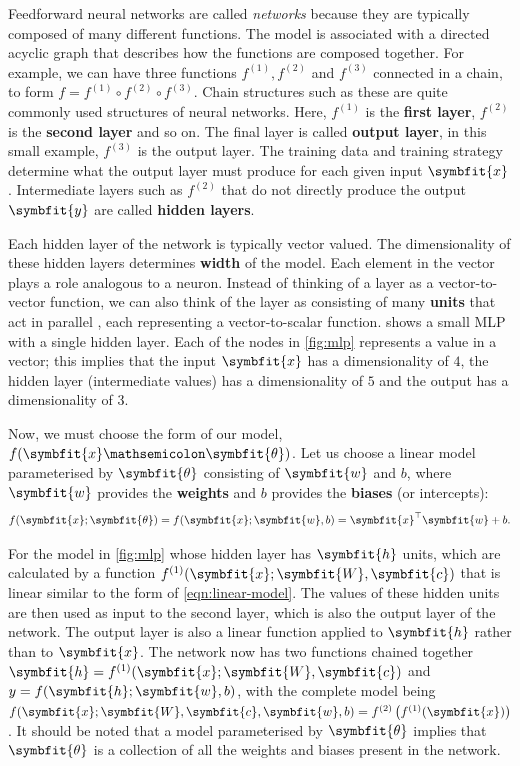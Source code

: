 Feedforward neural networks are called \textit{networks} because they are typically composed of many different functions. The model is associated with a directed acyclic graph that describes how the functions are composed together.
For example, we can have three functions \(f^{(1)}, f^{(2)}\) and $f^{(3)}$ connected in a chain, to form \(f = f^{(1)} \circ f^{(2)} \circ f^{(3)}\). 
Chain structures such as these are quite commonly used structures of neural networks. Here, $f^{(1)}$ is the \textbf{first layer}, $f^{(2)}$ is the \textbf{second layer} and so on. 
The final layer is called \textbf{output layer}, in this small example, $f^{(3)}$ is the output layer. The training data and training strategy determine what the output layer must produce for each given input $\symbfit{x}$.
Intermediate layers such as $f^{(2)}$ that do not directly produce the output $\symbfit{y}$ are called \textbf{hidden layers}.

Each hidden layer of the network is typically vector valued. The dimensionality of these hidden layers determines \textbf{width} of the model. Each element in the vector plays a role analogous to a neuron. Instead of thinking of a layer as a vector-to-vector function, we can also think of the layer as consisting of many \textbf{units} that act in parallel \parencite{Pinker1988}, each representing a vector-to-scalar function. 
 shows a small MLP with a single hidden layer. Each of the nodes in \cref{fig:mlp} represents a value in a vector; this implies that the input $\symbfit{x}$ has a dimensionality of $4$, the hidden layer (intermediate values) has a dimensionality of $5$ and the output has a dimensionality of $3$.

Now, we must choose the form of our model, $f(\symbfit{x} \mathsemicolon \symbfit{\theta})$. Let us choose a linear model parameterised by $\symbfit{\theta}$ consisting of $\symbfit{w}$ and $b$, where $\symbfit{w}$ provides the \textbf{weights} and $b$ provides the \textbf{biases} (or intercepts):
\begin{equation}
    \label{eqn:linear-model}
    f(\symbfit{x}; \symbfit{\theta}) = f(\symbfit{x} ; \symbfit{w}, b)=\symbfit{x}^{\top} \symbfit{w} + b.
\end{equation}

For the model in \cref{fig:mlp} whose hidden layer has $\symbfit{h}$ units, which are calculated by a function \(f^{(1)}(\symbfit{x}; \symbfit{W}, \symbfit{c})\) that is linear similar to the form of \cref{eqn:linear-model}. 
The values of these hidden units are then used as input to the second layer, which is also the output layer of the network. The output layer is also a linear function applied to $\symbfit{h}$ rather than to $\symbfit{x}$.
The network now has two functions chained together \(\symbfit{h} = f^{(1)}(\symbfit{x}; \symbfit{W}, \symbfit{c})\) and \(y = f(\symbfit{h} ; \symbfit{w}, b)\), with the complete model being $f(\symbfit{x} ; \symbfit{W}, \symbfit{c}, \symbfit{w}, b)=f^{(2)}\left(f^{(1)}(\symbfit{x})\right)$. It should be noted that a model parameterised by $\symbfit{\theta}$ implies that $\symbfit{\theta}$ is a collection of all the weights and biases present in the network.

